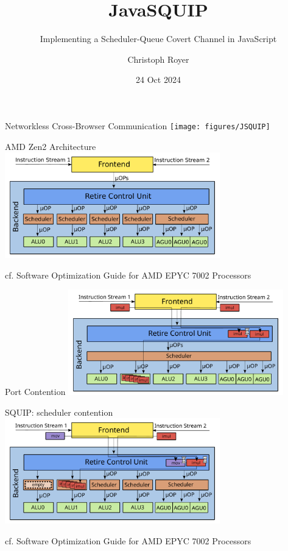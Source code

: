 \documentclass[aspectratio=169]{beamer}
\title[Short Title]{JavaSQUIP}
\subtitle[Subtitle]{Implementing a Scheduler-Queue Covert Channel in JavaScript}
\author{Christoph Royer}
\date{24 Oct 2024}
\institute{IAIK}
\begin{document}
\begin{frame}[plain]
  \maketitle
\end{frame}

\section{}

\begin{frame}{Networkless Cross-Browser Communication}
  \centering
  \texttt{[image: figures/JSQUIP]}
\end{frame}

\begin{frame}{AMD Zen2 Architecture}
\centering
\includegraphics[page=1, width=0.7\textwidth]{figures/Zen2arch.pdf}

\tiny{cf. Software Optimization Guide for AMD EPYC 7002 Processors}
\end{frame}

\begin{frame}{Port Contention}
\centering
\includegraphics[page=1, width=0.7\textwidth]{figures/Zen2 portcontention.pdf}
\end{frame}

\begin{frame}{SQUIP: scheduler contention}
\centering
\includegraphics[width=0.7\textwidth]{figures/Zen2 sqc.pdf}

\tiny{cf. Software Optimization Guide for AMD EPYC 7002 Processors}
\end{frame}
\end{document}
